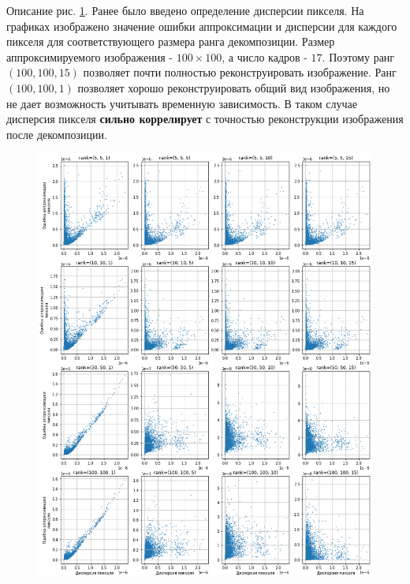 \documentclass[14pt]{extarticle}
\begin{document}
Описание рис. \ref{fig_5}. Ранее было введено определение дисперсии пикселя. На графиках изображено значение ошибки аппроксимации и дисперсии для каждого пикселя для соответствующего размера ранга декомпозиции. Размер аппроксимируемого изображения - $100\times100$, а число кадров - $17$. Поэтому ранг $(100, 100, 15)$ позволяет почти полностью реконструировать изображение. Ранг $(100, 100, 1)$ позволяет хорошо реконструировать общий вид изображения, но не дает возможность учитывать временную зависимость. В таком случае дисперсия пикселя \textbf{сильно коррелирует} с точностью реконструкции изображения после декомпозиции.

\begin{figure}[h]
        \centering
        \includegraphics[width=1\textwidth]{exp_4.png}
        
        \caption{}
        \label{fig_5}
\end{figure}
\end{document}
